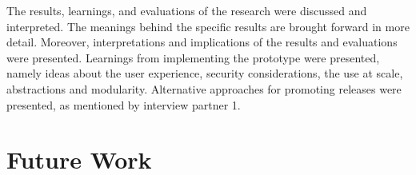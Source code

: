 The results, learnings, and evaluations of the research were discussed and interpreted.
The meanings behind the specific results are brought forward in more detail.
Moreover, interpretations and implications of the results and evaluations were presented.
Learnings from implementing the prototype were presented, namely
ideas about the user experience, security considerations, the use at scale, abstractions and modularity.
Alternative approaches for promoting releases were presented, as mentioned by interview partner 1.
%
%
%
%

\section*{Future Work}

